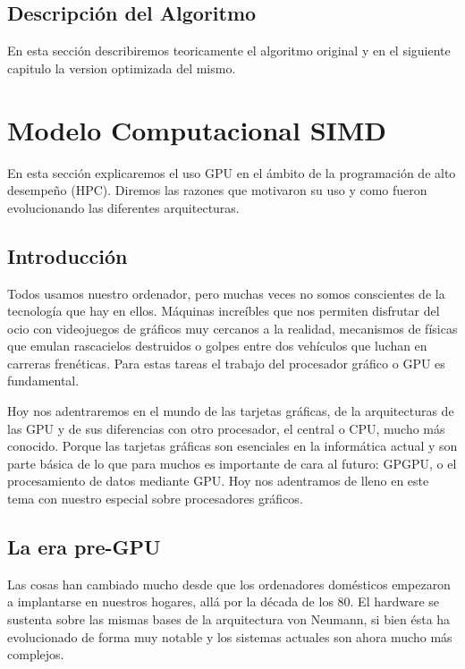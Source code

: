 \documentclass[a4paper,openright,12pt, oneside]{book}
\begin{document}
\section{Descripci\'on del Algoritmo}

En esta secci\'on describiremos teoricamente el algoritmo original y en el siguiente capitulo la version optimizada del mismo.


\setcounter{chapter}{3}
\setcounter{section}{0}
\chapter*{Modelo Computacional SIMD}\label{Modelo Computacional SIMD}
\markboth{}{} %

En esta secci\'on explicaremos el uso  GPU en el \'ambito de la programaci\'on de alto desempe\~no (HPC). Diremos las razones que motivaron su uso y como fueron evolucionando las diferentes arquitecturas.


\section{Introducci\'on}

Todos usamos nuestro ordenador, pero muchas veces no somos conscientes de la tecnolog\'ia que hay en ellos. M\'aquinas incre\'ibles que nos permiten disfrutar del ocio con videojuegos de gr\'aficos muy cercanos a la realidad, mecanismos de f\'isicas que emulan rascacielos destruidos o golpes entre dos veh\'iculos que luchan en carreras fren\'eticas. Para estas tareas el trabajo del procesador gr\'afico o GPU es fundamental.

Hoy nos adentraremos en el mundo de las tarjetas gr\'aficas, de la arquitecturas de las GPU y de sus diferencias con otro procesador, el central o CPU, mucho m\'as conocido. Porque las tarjetas gr\'aficas son esenciales en la inform\'atica actual y son parte b\'asica de lo que para muchos es importante de cara al futuro: GPGPU, o el procesamiento de datos mediante GPU. Hoy nos adentramos de lleno en este tema con nuestro especial sobre procesadores gr\'aficos.


\section{La era pre-GPU}

Las cosas han cambiado mucho desde que los ordenadores dom\'esticos empezaron a implantarse en nuestros hogares, all\'a por la d\'ecada de los 80. El hardware se sustenta sobre las mismas bases de la arquitectura von Neumann, si bien \'esta ha evolucionado de forma muy notable y los sistemas actuales son ahora mucho m\'as complejos.
\end{document}
